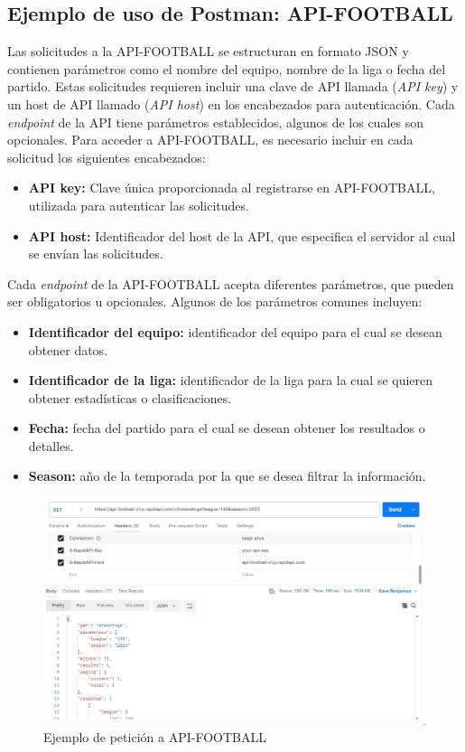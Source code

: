 \subsection{Ejemplo de uso de Postman: API-FOOTBALL}
Las solicitudes a la API-FOOTBALL se estructuran en formato JSON y contienen parámetros como el nombre del equipo, nombre de la liga o fecha del partido. Estas solicitudes requieren incluir una clave de API llamada (\textit{API key}) y un host de API llamado (\textit{API host}) en los encabezados para autenticación. Cada \textit{endpoint} de la API tiene parámetros establecidos, algunos de los cuales son opcionales.
Para acceder a API-FOOTBALL, es necesario incluir en cada solicitud los siguientes encabezados:
\begin{itemize}
    \item \textbf{API key:} Clave única proporcionada al registrarse en API-FOOTBALL, utilizada para autenticar las solicitudes.
    \item \textbf{API host:} Identificador del host de la API, que especifica el servidor al cual se envían las solicitudes.
\end{itemize}
Cada \textit{endpoint} de la API-FOOTBALL acepta diferentes parámetros, que pueden ser obligatorios u opcionales. Algunos de los parámetros comunes incluyen:
\begin{itemize}
    \item \textbf{Identificador del equipo:} identificador del equipo para el cual se desean obtener datos.
    \item \textbf{Identificador de la liga:} identificador de la liga para la cual se quieren obtener estadísticas o clasificaciones.
    \item \textbf{Fecha:} fecha del partido para el cual se desean obtener los resultados o detalles.
    \item \textbf{Season:} año de la temporada por la que se desea filtrar la información.
\end{itemize}

\begin{figure}[H]
    \centering
    \includegraphics[width=1\linewidth]{img/ejemploPostman.png}
    \caption{Ejemplo de petición a API-FOOTBALL}
    \label{fig:enter-label}
\end{figure}

